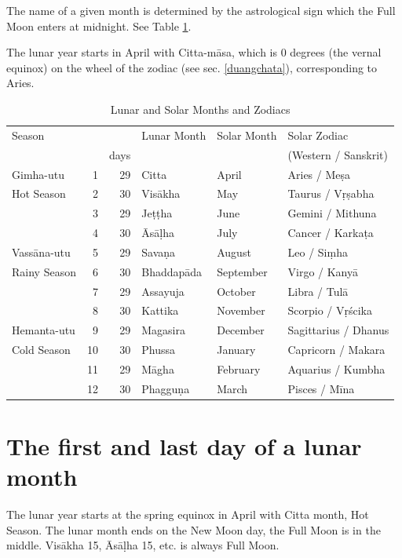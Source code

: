 \documentclass[11pt,oneside]{memoir-article}
\begin{document}
The name of a given month is determined by the astrological sign which
the Full Moon enters at midnight. See Table \ref{tbl-month-names}.

The lunar year starts in April with Citta-māsa, which is 0 degrees (the vernal
equinox) on the wheel of the zodiac (see sec. \ref{duangchata}), corresponding
to Aries.

\begin{table}[h]
\caption{\label{tbl-month-names} Lunar and Solar Months and Zodiacs}
\centering
\begin{tabular}{lrrlll}
Season &  &  & Lunar Month & Solar Month & Solar Zodiac\\
 &  & days &  &  & (Western / Sanskrit)\\
\hline
Gimha-utu & 1 & 29 & Citta & April & Aries / Meṣa\\
Hot Season & 2 & 30 & Visākha & May & Taurus / Vṛṣabha\\
 & 3 & 29 & Jeṭṭha & June & Gemini / Mithuna\\
 & 4 & 30 & Āsāḷha & July & Cancer / Karkaṭa\\
\hline
Vassāna-utu & 5 & 29 & Savaṇa & August & Leo / Siṃha\\
Rainy Season & 6 & 30 & Bhaddapāda & September & Virgo / Kanyā\\
 & 7 & 29 & Assayuja & October & Libra / Tulā\\
 & 8 & 30 & Kattika & November & Scorpio / Vṛścika\\
\hline
Hemanta-utu & 9 & 29 & Magasira & December & Sagittarius / Dhanus\\
Cold Season & 10 & 30 & Phussa & January & Capricorn / Makara\\
 & 11 & 29 & Māgha & February & Aquarius / Kumbha\\
 & 12 & 30 & Phagguṇa & March & Pisces / Mīna\\
\end{tabular}
\end{table}

\section{The first and last day of a lunar month}
\label{sec-4-3}
\label{lunar-month-first-last}

The lunar year starts at the spring equinox in April with Citta month, Hot
Season. The lunar month ends on the New Moon day, the Full Moon is in the
middle. Visākha 15, Āsāḷha 15, etc. is always Full Moon.
\end{document}
